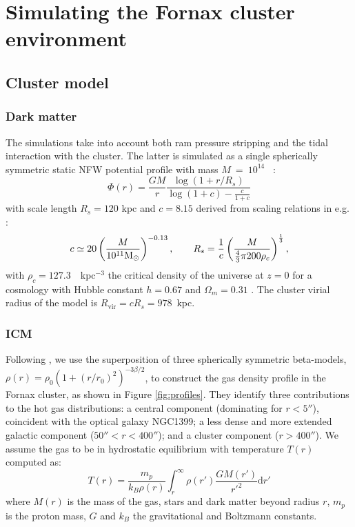 \section{Simulating the Fornax cluster environment}\label{sec:fornax_sim}

\subsection{Cluster model}

\subsubsection{Dark matter}
The simulations take into account both ram pressure stripping and the tidal interaction with the cluster.
The latter is simulated as a single spherically symmetric static NFW potential profile \citep{Navarro1996} with mass $M~=~10^{14}$~\Msun{} \citep{Drinkwater2001a}:
\begin{equation}
    \Phi(r) = \frac{G M}{r} \frac{\log(1+r/R_s)}{\log(1 + c) - \frac{c}{1+c}}
\end{equation}
with scale length $R_s = 120$ kpc and $c=8.15$ derived from scaling relations in e.g. \citet{Gentile2004, Wechsler2002}:
\begin{equation}
    c \simeq 20 \left(\frac{M}{10^{11} \text{\text{M}$_{\odot}${}} }\right)^{-0.13}, \qquad
    R_s = \frac 1 c \left(\frac{M}{\frac 4 3 \pi 200 \rho_c}\right)^\frac 1 3,
\end{equation}
with $\rho_c = 127.3$~\Msun{}~kpc$^{-3}$ the critical density of the universe at $z=0$ for a cosmology with Hubble constant $h=0.67$ and $\Omega_m = 0.31$ \citep{Planck2015}.
The cluster virial radius of the model is $R_{\mathrm{vir}} = c R_s = 978$~kpc.

\subsubsection{ICM} \label{sec:ICM}
Following \citet{Paolillo2002}, we use the superposition of three spherically symmetric beta-models, $\rho(r) = \rho_0 (1 + (r/r_0)^2 )^{-3\beta/2}$, to construct the gas density profile in the Fornax cluster, as shown in Figure \ref{fig:profiles}.
They identify three contributions to the hot gas distributions: a central component (dominating for $r<5''$), coincident with the optical galaxy NGC1399; a less dense and more extended galactic component ($50''<r<400''$); and a cluster component ($r>400''$).
We assume the gas to be in hydrostatic equilibrium with temperature $T(r)$ computed as:
\begin{equation}
   T(r) = \frac {m_p}{k_B \rho(r)} \int_r^\infty \rho(r') \frac{GM(r')}{r'^2} \mathrm{d} r'
\end{equation}
where $M(r)$ is the mass of the gas, stars and dark matter beyond radius $r$, $m_p$ is the proton mass, $G$ and $k_B$ the gravitational and Boltzmann constants.

